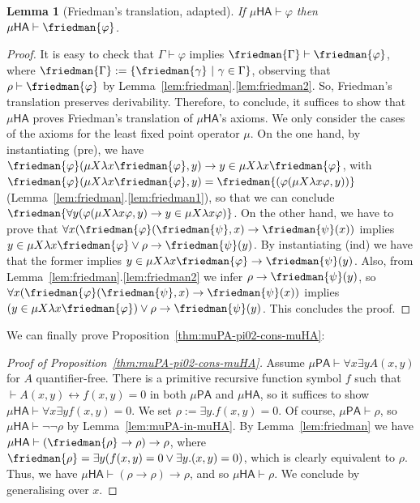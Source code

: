 \documentclass[10pt,a4paper]{amsart}
\theoremstyle{plain}
\newtheorem{lemma}[lemma]{Lemma}
\theoremstyle{definition}
\renewcommand{\phi}{\varphi}
\newcommand{\dfn}{:=}
\theoremstyle{plain}
\theoremstyle{definition} %
\newcommand{\limp}{\to}
\newcommand{\mufo}[3]{\mu #1 \lambda #2 #3}
\newcommand{\PA}{\mathsf{PA}}
\newcommand{\HA}{\mathsf{HA}}
\newcommand{\muPA}{\mu\PA}
\newcommand{\muHA}{\mu\HA}
\begin{document}
\begin{lemma}[Friedman's translation, adapted]
If $\muHA \vdash \phi$ then $\muHA \vdash \friedman{\phi}$.
\end{lemma}
\begin{proof}
       It is easy to check that $\Gamma \vdash \phi$ implies $\friedman{\Gamma}\vdash \friedman{\phi}$, where $\friedman{\Gamma}\dfn\{\friedman{\gamma} \ \vert \ \gamma \in \Gamma\}$, observing that $\rho \vdash \friedman{\phi}$ by Lemma~\ref{lem:friedman}.\ref{lem:friedman2}. So, Friedman's translation preserves derivability. Therefore, to conclude, it suffices to show that $\muHA$ proves Friedman's translation of $\muHA$'s axioms. We only consider the cases of the axioms for the least fixed point operator $\mu$.  On the one hand, by instantiating (pre), we have $\friedman{\phi}(\mufo X x \friedman{\phi}, y) \limp y \in \mufo X x \friedman{\phi}$, with $\friedman{\phi}(\mufo X x \friedman{\phi}, y)= \friedman{(\phi(\mufo X x\phi, y))}$ (Lemma~\ref{lem:friedman}.\ref{lem:friedman1}), so that we can conclude  $\friedman{\forall y (\phi(\mufo X x \phi, y) \limp y \in \mufo X x \phi)}$. On the other hand, we have to prove that $\forall x (\friedman{\phi}(\friedman{\psi}, x) \limp \friedman{\psi}(x)) $ implies $y \in \mufo X x \friedman{\phi} \vee \rho  \limp \friedman{\psi}(y)$.  By instantiating (ind) we have that the former implies $y \in \mufo X x \friedman{\phi}   \limp \friedman{\psi}(y)$. Also, from Lemma~\ref{lem:friedman}.\ref{lem:friedman2} we infer $\rho \to \friedman{\psi}(y)$, so $\forall x (\friedman{\phi}(\friedman{\psi}, x) \limp \friedman{\psi}(x))$ implies $(y \in \mufo X x \friedman{\phi}) \vee \rho  \limp \friedman{\psi}(y)$. This concludes the proof.
\end{proof}

We can finally prove Proposition~\ref{thm:muPA-pi02-cons-muHA}:

\begin{proof}[Proof of Proposition~\ref{thm:muPA-pi02-cons-muHA}]
Assume $\muPA \vdash \forall x\exists yA(x,y)$ for $A$ quantifier-free.  There is a primitive recursive function symbol $f$ such that $\vdash A(x,y)\leftrightarrow f(x,y)=0$ in both $\muPA$ and $\muHA$, so it suffices to show $\muHA \vdash \forall x\exists yf(x,y)=0$. We set $\rho\dfn \exists y .f(x,y)=0$.  Of course, $\muPA \vdash \rho$, so $\muHA \vdash \neg \neg \rho$ by Lemma~\ref{lem:muPA-in-muHA}. By Lemma~\ref{lem:friedman} we have  $\muHA \vdash (\friedman{\rho}\to \rho) \to \rho$, where $\friedman{\rho}= \exists y(f(x,y)=0 \vee \exists y.(x,y)=0)$, which is clearly equivalent to $\rho$. Thus, we have $\muHA \vdash (\rho\to \rho)\to \rho$, and so $\muHA\vdash \rho$. We conclude by generalising over $x$.
\end{proof}
\end{document}
